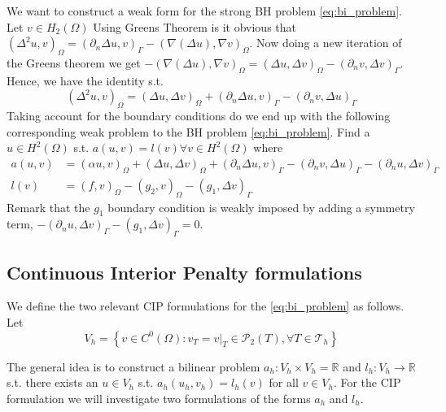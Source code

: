We want to construct a weak form for the strong BH problem \eqref{eq:bi_problem}. Let $v \in H_{2}( \Omega ) $  Using Greens Theorem is it obvious that \(
\left( \Delta ^2 u,v \right) _{ \Omega  }   = ( \partial _{n} \Delta u, v ) _{\Gamma   } - ( \nabla \left( \Delta  u \right) , \nabla v ) _{ \Omega }
\).
Now doing a new iteration of the Greens theorem we get
$ -( \nabla ( \Delta u ) , \nabla v ) _{\Omega  }  =   ( \Delta u, \Delta v ) _{\Omega } - ( \partial _{n}v , \Delta v)_{\Gamma } $.
Hence, we have the identity s.t.
\begin{equation}
\label{eq:iden_bi}
( \Delta ^2 u, v ) _{\Omega } = ( \Delta u, \Delta v)_{\Omega } +  ( \partial _{n} \Delta u, v)_{\Gamma } - ( \partial _{n} v, \Delta u) _{\Gamma }
\end{equation}
Taking account for the boundary conditions do we end up with the following corresponding weak problem to the BH problem \eqref{eq:bi_problem}.
Find a $u \in H^2( \Omega ) $ s.t. $a( u,v) = l( v)  \forall v \in H^{2}( \Omega )  $ where
  \[
      \begin{split}
a( u,v) & =  ( \alpha u,v)_{\Omega } + ( \Delta u, \Delta v)_{\Omega } +  ( \partial _{n} \Delta u, v)_{\Gamma } - ( \partial _{n} v, \Delta u) _{\Gamma } - ( \partial _{n} u, \Delta v) _{\Gamma }\\
l( v)  &= ( f,v)_{\Omega } - ( g_{2} , v)_\Omega - ( g_{1}, \Delta v) _{\Gamma }
      \end{split}
\]
Remark that the $g_{1}$ boundary condition is weakly imposed by adding a symmetry term, $- ( \partial _{n} u, \Delta v) _{\Gamma } - ( g_{1}, \Delta v) _{\Gamma }=0 $.


\subsection{Continuous Interior Penalty formulations}%
\label{sub:continuous_interior_penalty_formulations}

We define the two relevant CIP formulations for the \eqref{eq:bi_problem} as follows. Let $$V_{h} = \left\{ v \in C^{0}\left( \Omega  \right): v_{T} = v | _{T} \in \mathcal{P} _{2}\left( T \right), \forall T \in
\mathcal{T}_{h}    \right\}$$

The general idea is to construct a bilinear problem $a_{h}: V_{h} \times  V_{h} = \mathbb{R} $ and $l_{h}: V_{h} \to \mathbb{R} $ s.t. there exists an $u \in V_{h}$ s.t. $a_{h}( u_{h}, v_{h}) = l_{h}( v) $ for all $v \in V_{h}$. For the CIP
formulation we will investigate two formulations of the forms $a_{h}$ and $l_{h}$.

